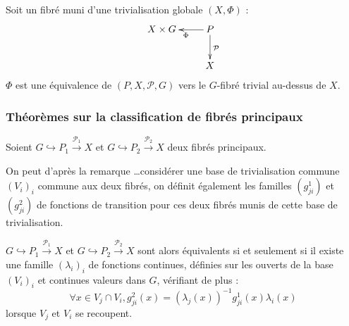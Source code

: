 \begin{exem}
Soit \Fig un fibr\'e muni d'une trivialisation globale $(X,\Phi)$ :
\[\xymatrix{X \times G & P \ar[l]^{\Phi} \ar[d]^{\mathcal{P}}\\ & X}\]
$\Phi$ est une \'equivalence de $(P,X,\mathcal{P},G)$ vers le $G$-fibr\'e trivial au-dessus de $X$.
\end{exem}

\subsubsection{Th\'eor\`emes sur la classification de fibr\'es principaux}

\begin{theo}\label{fbl}
Soient $G \hookrightarrow P_1 \xrightarrow{\mathcal{P}_1} X$ et $G \hookrightarrow P_2 \xrightarrow{\mathcal{P}_2} X$ deux fibrés principaux.

\par
On peut d'après la remarque \dots consid\'erer une base de trivialisation commune $(V_i)_i$ commune aux deux fibr\'es, %
on définit également les familles $(g^1_{ji})$ et $(g^2_{ji})$ de fonctions de transition pour ces deux fibrés munis de cette base de trivialisation.

\par
$G \hookrightarrow P_1 \xrightarrow{\mathcal{P}_1} X$ et $G \hookrightarrow P_2 \xrightarrow{\mathcal{P}_2} X$ sont alors \'equivalents si et seulement si %
il existe une famille $(\lambda_i)_i$ de fonctions continues, d\'efinies sur les ouverts de la base $(V_i)_i$ et continues  valeurs dans $G$, v\'erifiant de plus :
\[\forall x \in V_j \cap V_i , g^2_{ji}(x) = (\lambda_j(x))^{-1}g^1_{ji}(x)\lambda_i(x)\]
lorsque $V_j$ et $V_i$ se recoupent.
\end{theo}

